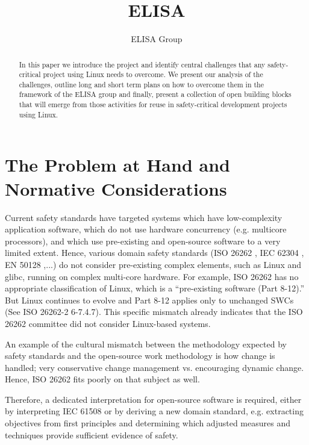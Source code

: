 \documentclass[12pt]{../Common_files/ElisaPaper}
\title{ELISA}
\author{ELISA Group}
\begin{document}
	
\maketitle	
\begin{abstract}
In this paper we introduce the project and identify central challenges that any safety-critical project using Linux needs to overcome.
We present our analysis of the challenges, outline long and short term plans on how to overcome them in the framework of the ELISA group and finally, present a collection of open building blocks that will emerge from those activities for reuse in safety-critical development projects using Linux.
\end{abstract}

\tableofcontents

\section{The Problem at Hand and Normative Considerations}
Current safety standards have targeted systems which have low-complexity application software, which do not use hardware concurrency (e.g. multicore processors), and which use pre-existing and open-source software to a very limited extent. 
Hence, various domain safety standards (ISO 26262 \cite{ISO26262:2018}, IEC 62304 \cite{IEC62304}, EN 50128 \cite{DINEN50128},...) do not consider pre-existing complex elements, such as Linux and glibc, running on complex multi-core hardware. 
For example, ISO 26262 has no appropriate classification of Linux, which is a “pre-existing software  (Part 8-12).” 
But Linux continues to evolve and Part 8-12 applies only to unchanged SWCs (See ISO 26262-2 6-7.4.7). 
This specific mismatch already indicates that the ISO 26262 committee did not consider Linux-based systems.

An example of the cultural mismatch between the methodology expected by safety standards and the open-source work methodology is how change is handled; very conservative change management vs. encouraging dynamic change.
Hence, ISO 26262 fits poorly on that subject as well.

Therefore, a dedicated interpretation for open-source software is required, either by interpreting IEC 61508 or by deriving a new domain standard, e.g. extracting objectives from first principles and determining which adjusted measures and techniques provide sufficient evidence of safety.
\end{document}
